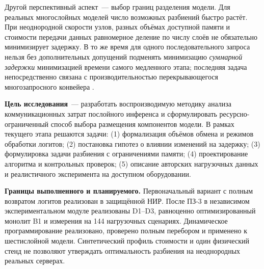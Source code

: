 Другой перспективный аспект~--- выбор границ разделения модели. Для реальных многослойных моделей число возможных разбиений быстро растёт. При неоднородной скорости узлов, разных объёмах доступной памяти и стоимости передачи данных равномерное деление по числу слоёв не обязательно минимизирует задержку. В то же время для одного последовательного запроса нельзя без дополнительных допущений подменять минимизацию \emph{суммарной задержки} минимизацией времени самого медленного этапа; последняя задача непосредственно связана с производительностью перекрывающегося многозапросного конвейера \cite{hwang2026}.

\textbf{Цель исследования}~--- разработать воспроизводимую методику анализа коммуникационных затрат послойного инференса и сформулировать ресурсно-ограниченный способ выбора размещения компонентов модели. В рамках текущего этапа решаются задачи: (1) формализация объёмов обмена и режимов обработки логитов; (2) постановка гипотез о влиянии изменений на задержку; (3) формулировка задачи разбиения с ограничениями памяти; (4) проектирование алгоритма и контрольных проверок; (5) описание авторских нагрузочных данных и реалистичного эксперимента на доступном оборудовании.

\textbf{Границы выполненного и планируемого.} Первоначальный вариант с полным возвратом логитов реализован в защищённой НИР. После ПЗ-3 в независимом экспериментальном модуле реализованы D1--D3, равноценно оптимизированный монолит B1 и измерения на 144 нагрузочных сценариях. Динамическое программирование реализовано, проверено полным перебором и применено к шестислойной модели. Синтетический профиль стоимости и один физический стенд не позволяют утверждать оптимальность разбиения на неоднородных реальных серверах.
